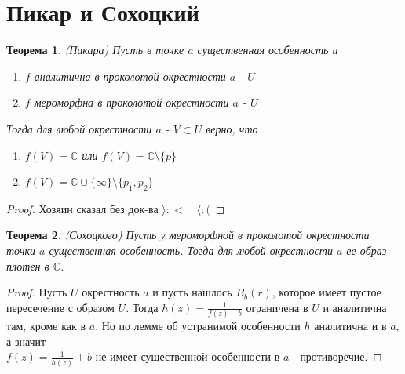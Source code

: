 \documentclass[12pt,a4paper]{article} %
\newtheorem{theorem}{Теорема}
\newcommand{\Co}{\mathbb{C}}
\begin{document}
	\section{Пикар и Сохоцкий}
	\begin{theorem}
		(Пикара) Пусть в точке $a$ существенная особенность и
		\begin{enumerate}
			\item $f$ аналитична в проколотой окрестности $a$ - $U$
			\item $f$ мероморфна в проколотой окрестности $a$ - $U$
		\end{enumerate}
		Тогда для любой окрестности $a$ - $V\subset U$ верно, что
		\begin{enumerate}
			\item $f(V)=\Co$ или $f(V)=\Co\setminus\{p\}$
			\item $f(V)=\Co\cup\{\infty\}\setminus\{p_1,p_2\}$
		\end{enumerate}
	\end{theorem}
	\begin{proof}
		Хозяин сказал без док-ва $\rangle:<\quad \langle:($
	\end{proof}
	\begin{theorem}
		(Сохоцкого) Пусть у мероморфной в проколотой окрестности точки $a$ существенная особенность. Тогда для любой окрестности $a$ ее образ плотен в $\Co$.
	\end{theorem}
	\begin{proof}
		Пусть $U$ окрестность $a$ и пусть нашлось $B_{b}(r)$, которое имеет пустое пересечение с образом $U$. Тогда $h(z)=\displaystyle\frac{1}{f(z)-b}$ ограничена в $U$ и аналитична там, кроме как в $a$. Но по лемме об устранимой особенности $h$ аналитична и в $a$, а значит \\$f(z)=\displaystyle\frac{1}{h(z)}+b$ не имеет существенной особенности в $a$ - противоречие.
	\end{proof}
\end{document}
